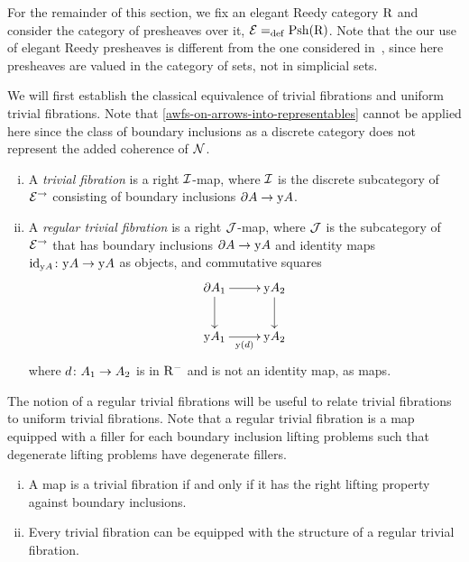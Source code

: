 \documentclass[reqno,10pt,a4paper,oneside,draft]{amsart}
\begin{document}
\medskip

For the remainder of this section, we fix an elegant Reedy category $\R$ and consider the category of presheaves over it, $\calE \defeq \Rhat$.
Note that the our use of elegant Reedy presheaves is different from the one considered in~\cite{shulman:reedy}, since here 
presheaves are valued in the category of sets, not in simplicial sets.

We will first establish the classical equivalence of trivial fibrations and uniform trivial fibrations.
Note that \cref{awfs-on-arrows-into-representables} cannot be applied here since the class of boundary inclusions as a discrete category does not represent the added coherence of $\cal{N}$.

\begin{definition} \hfill
\begin{enumerate}[(i)]
\item A \emph{trivial fibration} is a right $\cal{I}$-map, where $\cal{I}$ is the discrete subcategory of $\catE^{\to}$ consisting of boundary inclusions $\partial A \to \yon A$.
\item A \emph{regular trivial fibration} is a right $\cal{J}$-map, where $\cal{J}$ is the subcategory of~$\catE^{\to}$ that has boundary inclusions $\partial A \to \yon A$ and identity maps $\id_{\yon A} \co \yon A \to \yon A$ as objects, and commutative squares
\[
\xymatrix{
  \partial A_1
  \ar[r]
  \ar[d]
&
  \yon A_2
  \ar[d]
\\
  \yon A_1
  \ar[r]_{\yon(d)}
&
  \yon A_2
}
\]
where $d \co A_1 \to A_2$  is in $\Rm$ and is not an identity map, as maps.
\end{enumerate}
\end{definition}

The notion of a regular trivial fibrations will be useful to relate trivial fibrations to uniform trivial fibrations.
Note that a regular trivial fibration is a map equipped with a filler for each boundary inclusion lifting problems such that degenerate lifting problems have degenerate fillers.

\begin{proposition} \label{trivial-fibration-to-regular} \hfill
\begin{enumerate}[(i)]
\item A map is a trivial fibration if and only if it has the right lifting property against boundary inclusions.
\item Every trivial fibration can be equipped with the structure of a regular trivial fibration.
\end{enumerate}
\end{proposition}
\end{document}
